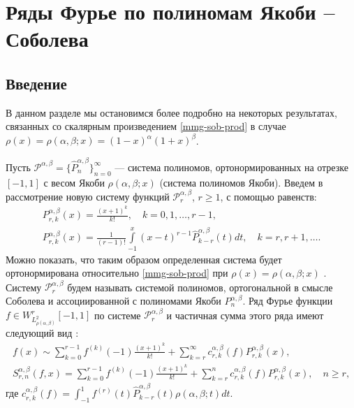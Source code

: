 \chapter{Ряды Фурье по полиномам Якоби -- Соболева}\label{MMG}
\section{Введение}
В данном разделе мы остановимся более подробно на некоторых результатах, связанных со скалярным произведением \eqref{mmg-sob-prod} в случае $\rho(x)=\rho(\alpha,\beta; x)=(1-x)^\alpha(1+x)^\beta$.

Пусть $\mathcal{P}^{\alpha,\beta}=\{ \hat{P}_n^{\alpha,\beta} \}_{n=0}^\infty$ --- система полиномов, ортонормированных на отрезке $[-1,1]$ с весом Якоби $\rho(\alpha,\beta; x)$ (система полиномов Якоби). Введем в рассмотрение новую систему функций $\mathcal{P}^{\alpha,\beta}_r$, $r \ge 1$, с помощью равенств:
\begin{gather}
	\label{mmg-sob-def1}
	P_{r,k}^{\alpha,\beta}(x) =\frac{(x+1)^k}{k!}, \quad k=0,1,\ldots, r-1,\\
	\label{mmg-sob-def2}
	P_{r,k}^{\alpha,\beta}(x) =\frac{1}{(r-1)!}\int\limits_{-1}^x(x-t)^{r-1}\hat{P}_{k-r}^{\alpha,\beta}(t)dt, \quad k=r,r+1,\ldots.
\end{gather}
Можно показать, что таким образом определенная система будет ортонормирована относительно \eqref{mmg-sob-prod} при $\rho(x)=\rho(\alpha,\beta; x)$ \cite[с.~231]{mmg-Shii-izvran2018}. Систему $\mathcal{P}_r^{\alpha,\beta}$ будем называть системой полиномов, ортогональной в смысле Соболева и ассоциированной с полиномами Якоби $P_n^{\alpha,\beta}$.
Ряд Фурье функции $f \in W^r_{L^2_{\rho(\alpha,\beta)}}[-1,1]$ по системе $\mathcal{P}_r^{\alpha,\beta}$ и частичная сумма этого ряда имеют следующий вид \cite[с.~227]{mmg-Shii-izvran2018}:
\begin{gather}
	\label{mmg-sob-fourier-series}
	f(x) \sim \sum_{k=0}^{r-1} f^{(k)}(-1)\frac{(x+1)^k}{k!}+ \sum_{k=r}^\infty c^{\alpha,\beta}_{r,k}(f) P_{r,k}^{\alpha,\beta}(x),\\
	\label{mmg-sob-part-sum}
	S^{\alpha,\beta}_{r,n}(f,x) = \sum_{k=0}^{r-1} f^{(k)}(-1)\frac{(x+1)^k}{k!}+ \sum_{k=r}^n c^{\alpha,\beta}_{r,k}(f) P_{r,k}^{\alpha,\beta}(x), \quad n \ge r,
\end{gather}
где $c^{\alpha,\beta}_{r,k}(f)=\int_{-1}^1 f^{(r)}(t)\hat{P}_{k-r}^{\alpha,\beta}(t)\rho(\alpha,\beta; t)dt$.

